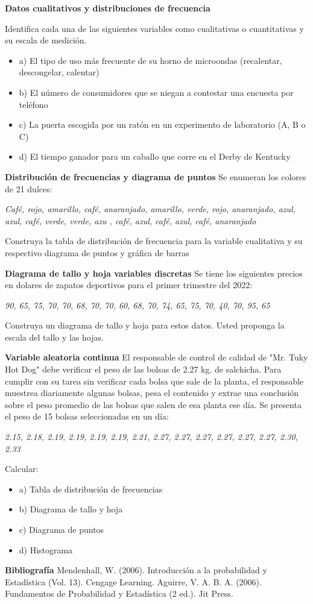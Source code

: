 \documentclass{../oxmathproblems}
\begin{document}
\begin{questions}

\miquestion \textbf{Datos cualitativos y distribuciones de frecuencia}

Identifica cada una de las siguientes variables como cualitativas o cuantitativas y su escala de medición. 
\begin{itemize}

\item a) El tipo de uso más frecuente de su horno de microondas (recalentar, descongelar, calentar)

\item b) El número de consumidores que se niegan a contestar una encuesta por teléfono 

\item c) La puerta escogida por un ratón en un experimento de laboratorio (A, B o C)

\item d) El tiempo ganador para un caballo que corre en el Derby de Kentucky 

\end{itemize}

\miquestion \textbf{Distribución de frecuencias y diagrama de puntos}
Se enumeran los colores de 21 dulces: 

\textit{Café, rojo, amarillo, café, anaranjado, amarillo, verde, rojo, anaranjado, azul, azul, café, verde, verde, azu , café, azul, café, azul, café, anaranjado}

Construya la tabla de distribución de frecuencia para la variable cualitativa y su respectivo diagrama de puntos y gráfica de barras

\miquestion \textbf{Diagrama de tallo y hoja variables discretas}
Se tiene los siguientes precios en dolares de zapatos deportivos para el primer trimestre del 2022:

\textit{90, 65, 75, 70, 70, 68, 70, 70, 60, 68, 70, 74, 65, 75, 70, 40, 70, 95, 65}

Construya un diagrama de tallo y hoja para estos datos. Usted proponga la escala del tallo y las hojas.

\miquestion \textbf{Variable aleatoria continua}
El responsable de control de calidad de "Mr. Tuky Hot Dog" debe verificar el peso de las bolsas de 2.27 kg. de salchicha. Para cumplir con su tarea sin verificar cada bolsa que sale de la planta, el responsable muestrea diariamente algunas bolsas, pesa el contenido y extrae una conclusión sobre el peso promedio de las bolsas que salen de esa planta ese día. Se presenta el peso de 15 bolsas seleccionadas en un día: 

\textit{2.15, 2.18, 2.19, 2.19, 2.19, 2.19, 2.21, 2.27, 2.27, 2.27, 2.27, 2.27, 2.27, 2.30, 2.33}

Calcular: 
\begin{itemize}
\item a) Tabla de distribución de frecuencias
\item b) Diagrama de tallo y hoja
\item c) Diagrama de puntos 
\item d) Histograma 
\end{itemize}

\end{questions}
\textbf{Bibliografía}
Mendenhall, W. (2006). Introducción a la probabilidad y Estadística (Vol. 13). Cengage Learning.
Aguirre, V. A. B. A. (2006). Fundamentos de Probabilidad y Estadística (2 ed.). Jit Press.
\end{document}
